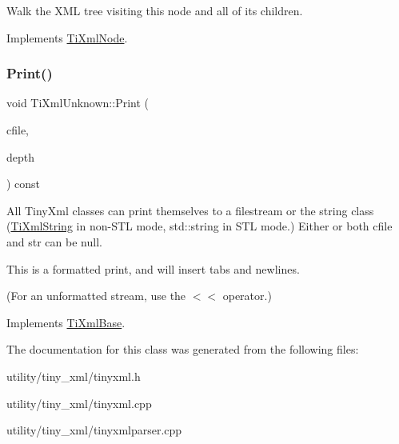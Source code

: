 Walk the X\+ML tree visiting this node and all of its children. 

Implements \hyperlink{class_ti_xml_node_acc0f88b7462c6cb73809d410a4f5bb86}{Ti\+Xml\+Node}.

\hypertarget{class_ti_xml_unknown_a5793fbc48ab3419783c0e866ca2d334e}{}\label{class_ti_xml_unknown_a5793fbc48ab3419783c0e866ca2d334e} 
\subsubsection{\texorpdfstring{Print()}{Print()}}
{\footnotesize\ttfamily void Ti\+Xml\+Unknown\+::\+Print (\begin{DoxyParamCaption}\item[{F\+I\+LE $\ast$}]{cfile,  }\item[{int}]{depth }\end{DoxyParamCaption}) const\hspace{0.3cm}{\ttfamily [virtual]}}

All Tiny\+Xml classes can print themselves to a filestream or the string class (\hyperlink{class_ti_xml_string}{Ti\+Xml\+String} in non-\/\+S\+TL mode, std\+::string in S\+TL mode.) Either or both cfile and str can be null.

This is a formatted print, and will insert tabs and newlines.

(For an unformatted stream, use the $<$$<$ operator.) 

Implements \hyperlink{class_ti_xml_base_a0de56b3f2ef14c65091a3b916437b512}{Ti\+Xml\+Base}.



The documentation for this class was generated from the following files\+:\begin{DoxyCompactItemize}
\item 
utility/tiny\+\_\+xml/tinyxml.\+h\item 
utility/tiny\+\_\+xml/tinyxml.\+cpp\item 
utility/tiny\+\_\+xml/tinyxmlparser.\+cpp\end{DoxyCompactItemize}
